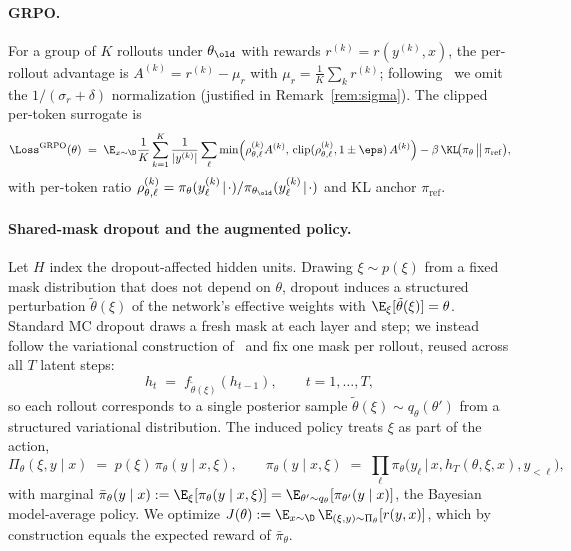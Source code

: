 \paragraph{GRPO.}
For a group of $K$ rollouts under $\theta_\old$ with rewards
$r^{(k)} = r(y^{(k)}, x)$, the per-rollout advantage is
$A^{(k)} = r^{(k)} - \mu_r$ with $\mu_r = \tfrac{1}{K}\sum_k r^{(k)}$;
following~\citet{liu2024drgrpo} we omit the $1/(\sigma_r + \delta)$
normalization (justified in
Remark~\ref{rem:sigma}).  The clipped per-token surrogate
\citep{shao2024deepseekmath} is
\begin{equation}
\Loss^{\mathrm{GRPO}}(\theta)
   \;=\;
\E_{x \sim \D}
   \frac{1}{K}\sum_{k=1}^K
   \frac{1}{|y^{(k)}|}\sum_\ell
      \min\!\Big(\rho_{\theta,\ell}^{(k)} A^{(k)},\,
                  \mathrm{clip}(\rho_{\theta,\ell}^{(k)}, 1\pm\eps)\, A^{(k)}\Big)
   - \beta\,\KL\!\big(\pi_\theta\,\big\|\,\pi_{\mathrm{ref}}\big),
\label{eq:theory-grpo-loss}
\end{equation}
with per-token ratio
$\rho_{\theta,\ell}^{(k)} = \pi_\theta(y_\ell^{(k)}\!\mid\!\cdot)/\pi_{\theta_\old}(y_\ell^{(k)}\!\mid\!\cdot)$
and KL anchor $\pi_{\mathrm{ref}}$.

\paragraph{Shared-mask dropout and the augmented policy.}
Let $H$ index the dropout-affected hidden units.  Drawing
$\xi \sim p(\xi)$ from a fixed mask distribution that does not depend
on $\theta$, dropout induces a structured perturbation
$\tilde\theta(\xi)$ of the network's effective weights with
$\E_\xi[\tilde\theta(\xi)] = \theta$.  Standard MC dropout draws a
fresh mask at each layer and step; we instead follow the variational
construction of~\citet{gal2016dropout} and fix one mask per rollout,
reused across all $T$ latent steps:
\begin{equation}
h_t \;=\; f_{\tilde\theta(\xi)}(h_{t-1}),
\qquad t = 1, \dots, T,
\label{eq:theory-perturbed}
\end{equation}
so each rollout corresponds to a single posterior sample
$\tilde\theta(\xi) \sim q_\theta(\theta')$ from a structured
variational distribution.  The induced policy treats $\xi$ as part of
the action,
\begin{equation}
\Pi_\theta(\xi, y \mid x) \;=\; p(\xi)\,\pi_\theta(y \mid x, \xi),
\qquad
\pi_\theta(y \mid x, \xi)
   \;=\; \prod_\ell \pi_\theta\!\big(y_\ell \,\big|\, x, h_T(\theta, \xi, x), y_{<\ell}\big),
\label{eq:theory-augmented-policy}
\end{equation}
with marginal
$\bar\pi_\theta(y \mid x) := \E_{\xi}[\pi_\theta(y \mid x, \xi)]
   = \E_{\theta' \sim q_\theta}[\pi_{\theta'}(y \mid x)]$, the
Bayesian model-average policy.  We optimize
$J(\theta) := \E_{x \sim \D}\, \E_{(\xi, y) \sim \Pi_\theta}[r(y, x)]$,
which by construction equals the expected reward of $\bar\pi_\theta$.

